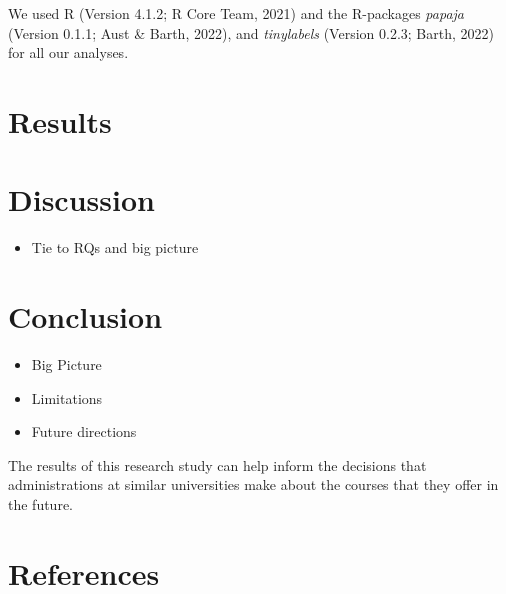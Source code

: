 \documentclass[
  man]{apa6}
\providecommand{\tightlist}{%
  \setlength{\itemsep}{0pt}\setlength{\parskip}{0pt}}
\begin{document}
We used R (Version 4.1.2; R Core Team, 2021) and the R-packages \emph{papaja} (Version 0.1.1; Aust \& Barth, 2022), and \emph{tinylabels} (Version 0.2.3; Barth, 2022) for all our analyses.

\hypertarget{results}{%
\section{Results}\label{results}}

\hypertarget{discussion}{%
\section{Discussion}\label{discussion}}

\begin{itemize}
\tightlist
\item
  Tie to RQs and big picture
\end{itemize}

\hypertarget{conclusion}{%
\section{Conclusion}\label{conclusion}}

\begin{itemize}
\item
  Big Picture
\item
  Limitations
\item
  Future directions
\end{itemize}

The results of this research study can help inform the decisions that administrations at similar universities make about the courses that they offer in the future.

\newpage

\hypertarget{references}{%
\section{References}\label{references}}
\end{document}
